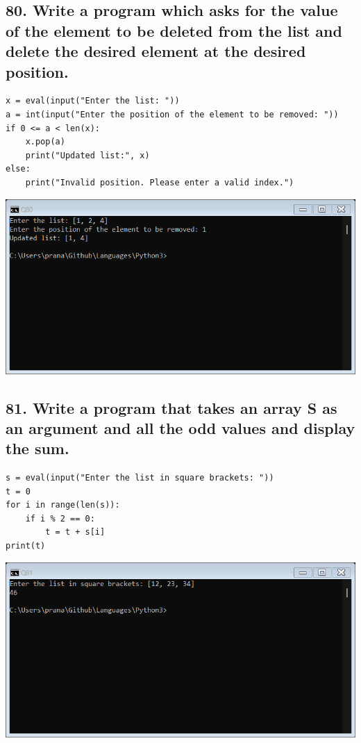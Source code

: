 \documentclass[12pt]{article}
\begin{document}
\subsection*{80. Write a program which asks for the value of the element to be deleted from the list and delete the desired element at the desired position.}
\begin{verbatim}
x = eval(input("Enter the list: "))
a = int(input("Enter the position of the element to be removed: "))
if 0 <= a < len(x):
    x.pop(a)
    print("Updated list:", x)
else:
    print("Invalid position. Please enter a valid index.")
\end{verbatim}
\includegraphics[width=\linewidth]{images/80.png}

\subsection*{81. Write a program that takes an array S as an argument and all the odd values and display the sum.}
\begin{verbatim}
s = eval(input("Enter the list in square brackets: "))
t = 0
for i in range(len(s)):
    if i % 2 == 0:
        t = t + s[i]
print(t)
\end{verbatim}
\includegraphics[width=\linewidth]{images/81.png}
\end{document}
